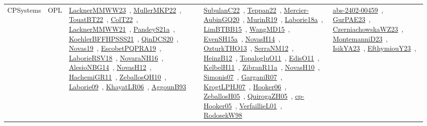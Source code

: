 {\begin{longtable}{lp{3cm}>{\raggedright\arraybackslash}p{6cm}>{\raggedright\arraybackslash}p{6cm}>{\raggedright\arraybackslash}p{8cm}}
CPSystems & OPL & \href{articles/LacknerMMWW23.pdf}{LacknerMMWW23}~\cite{LacknerMMWW23}, \href{articles/MullerMKP22.pdf}{MullerMKP22}~\cite{MullerMKP22}, \href{papers/TouatBT22.pdf}{TouatBT22}~\cite{TouatBT22}, \href{articles/ColT22.pdf}{ColT22}~\cite{ColT22}, \href{papers/LacknerMMWW21.pdf}{LacknerMMWW21}~\cite{LacknerMMWW21}, \href{articles/PandeyS21a.pdf}{PandeyS21a}~\cite{PandeyS21a}, \href{articles/KoehlerBFFHPSSS21.pdf}{KoehlerBFFHPSSS21}~\cite{KoehlerBFFHPSSS21}, \href{articles/QinDCS20.pdf}{QinDCS20}~\cite{QinDCS20}, \href{articles/Novas19.pdf}{Novas19}~\cite{Novas19}, \href{articles/EscobetPQPRA19.pdf}{EscobetPQPRA19}~\cite{EscobetPQPRA19}, \href{articles/LaborieRSV18.pdf}{LaborieRSV18}~\cite{LaborieRSV18}, \href{articles/NovaraNH16.pdf}{NovaraNH16}~\cite{NovaraNH16}, \href{papers/AlesioNBG14.pdf}{AlesioNBG14}~\cite{AlesioNBG14}, \href{articles/NovasH12.pdf}{NovasH12}~\cite{NovasH12}, \href{articles/HachemiGR11.pdf}{HachemiGR11}~\cite{HachemiGR11}, \href{articles/ZeballosQH10.pdf}{ZeballosQH10}~\cite{ZeballosQH10}, \href{papers/Laborie09.pdf}{Laborie09}~\cite{Laborie09}, \href{articles/KhayatLR06.pdf}{KhayatLR06}~\cite{KhayatLR06}, \href{articles/AggounB93.pdf}{AggounB93}~\cite{AggounB93} & \href{articles/SubulanC22.pdf}{SubulanC22}~\cite{SubulanC22}, \href{papers/Teppan22.pdf}{Teppan22}~\cite{Teppan22}, \href{papers/Mercier-AubinGQ20.pdf}{Mercier-AubinGQ20}~\cite{Mercier-AubinGQ20}, \href{papers/MurinR19.pdf}{MurinR19}~\cite{MurinR19}, \href{papers/Laborie18a.pdf}{Laborie18a}~\cite{Laborie18a}, \href{papers/LimBTBB15.pdf}{LimBTBB15}~\cite{LimBTBB15}, \href{articles/WangMD15.pdf}{WangMD15}~\cite{WangMD15}, \href{articles/EvenSH15a.pdf}{EvenSH15a}~\cite{EvenSH15a}, \href{articles/NovasH14.pdf}{NovasH14}~\cite{NovasH14}, \href{articles/OzturkTHO13.pdf}{OzturkTHO13}~\cite{OzturkTHO13}, \href{papers/SerraNM12.pdf}{SerraNM12}~\cite{SerraNM12}, \href{papers/HeinzB12.pdf}{HeinzB12}~\cite{HeinzB12}, \href{articles/TopalogluO11.pdf}{TopalogluO11}~\cite{TopalogluO11}, \href{papers/EdisO11.pdf}{EdisO11}~\cite{EdisO11}, \href{articles/KelbelH11.pdf}{KelbelH11}~\cite{KelbelH11}, \href{papers/ZibranR11a.pdf}{ZibranR11a}~\cite{ZibranR11a}, \href{articles/NovasH10.pdf}{NovasH10}~\cite{NovasH10}, \href{articles/Simonis07.pdf}{Simonis07}~\cite{Simonis07}, \href{papers/GarganiR07.pdf}{GarganiR07}~\cite{GarganiR07}, \href{papers/KrogtLPHJ07.pdf}{KrogtLPHJ07}~\cite{KrogtLPHJ07}, \href{articles/Hooker06.pdf}{Hooker06}~\cite{Hooker06}, \href{articles/ZeballosH05.pdf}{ZeballosH05}~\cite{ZeballosH05}, \href{papers/QuirogaZH05.pdf}{QuirogaZH05}~\cite{QuirogaZH05}, \href{papers/cp-Hooker05.pdf}{cp-Hooker05}~\cite{cp-Hooker05}, \href{papers/VerfaillieL01.pdf}{VerfaillieL01}~\cite{VerfaillieL01}, \href{papers/RodosekW98.pdf}{RodosekW98}~\cite{RodosekW98} & \href{articles/abs-2402-00459.pdf}{abs-2402-00459}~\cite{abs-2402-00459}, \href{articles/GurPAE23.pdf}{GurPAE23}~\cite{GurPAE23}, \href{articles/CzerniachowskaWZ23.pdf}{CzerniachowskaWZ23}~\cite{CzerniachowskaWZ23}, \href{articles/MontemanniD23.pdf}{MontemanniD23}~\cite{MontemanniD23}, \href{articles/IsikYA23.pdf}{IsikYA23}~\cite{IsikYA23}, \href{papers/EfthymiouY23.pdf}{EfthymiouY23}~\cite{EfthymiouY23}, 
\end{longtable}}
